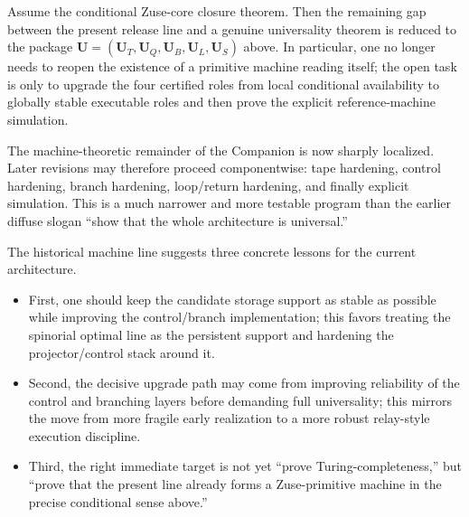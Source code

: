 \begin{proposition}
Assume the conditional Zuse-core closure theorem. Then the remaining gap between the present release line and a genuine universality theorem is reduced to the package $\mathbf U=(\mathbf U_T,\mathbf U_Q,\mathbf U_B,\mathbf U_L,\mathbf U_S)$ above. In particular, one no longer needs to reopen the existence of a primitive machine reading itself; the open task is only to upgrade the four certified roles from local conditional availability to globally stable executable roles and then prove the explicit reference-machine simulation.
\end{proposition}

\begin{corollary}
The machine-theoretic remainder of the Companion is now sharply localized. Later revisions may therefore proceed componentwise: tape hardening, control hardening, branch hardening, loop/return hardening, and finally explicit simulation. This is a much narrower and more testable program than the earlier diffuse slogan ``show that the whole architecture is universal.''
\end{corollary}

\begin{remark}
The historical machine line suggests three concrete lessons for the current architecture.
\begin{itemize}[leftmargin=2em]
  \item First, one should keep the candidate storage support as stable as possible while improving the control/branch implementation; this favors treating the spinorial optimal line as the persistent support and hardening the projector/control stack around it.
  \item Second, the decisive upgrade path may come from improving reliability of the control and branching layers before demanding full universality; this mirrors the move from more fragile early realization to a more robust relay-style execution discipline.
  \item Third, the right immediate target is not yet ``prove Turing-completeness,'' but ``prove that the present line already forms a Zuse-primitive machine in the precise conditional sense above.''
\end{itemize}
\end{remark}




